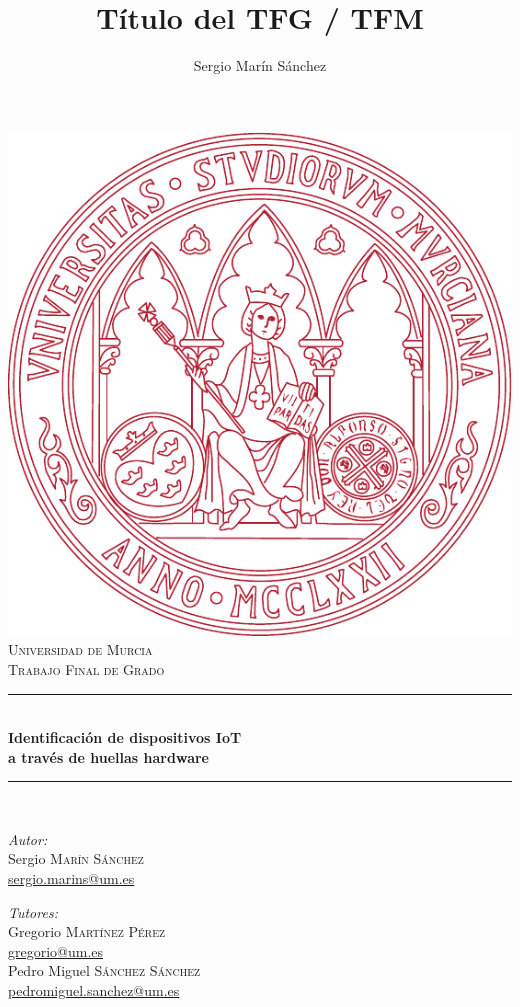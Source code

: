 \documentclass[a4paper,12pt]{book}
\newcommand{\HRule}{\rule{\linewidth}{0.5mm}}
\begin{document}
\title{Título del TFG / TFM}
\author{Sergio Marín Sánchez}

\begin{titlepage}
 
\begin{center}
 
\vfill

\includegraphics[height=0.5\textwidth]{escudo}\\[2.5cm]
 
\textsc{\LARGE Universidad de Murcia}\\[0.5cm]
 
\textsc{\Large Trabajo Final de Grado}\\[0.5cm]
 
\HRule \\[0.4cm]
{ \huge \bfseries Identificación de dispositivos IoT}\\[0.4cm]
{ \huge \bfseries  a través de huellas hardware}\\[0.4cm]
\HRule \\[1.5cm]
 
\begin{minipage}{0.4\textwidth}
\begin{flushleft} \large
\emph{Autor:}\\
Sergio \textsc{Marín Sánchez}\\
\href{mailto:sergio.marins@um.es}{sergio.marins@um.es}
\end{flushleft}
\end{minipage}
\begin{minipage}{0.4\textwidth}
\begin{flushright} \large
\emph{Tutores:} \\
Gregorio \textsc{Martínez Pérez}\\
\href{mailto:gregorio@um.es}{gregorio@um.es}\\
Pedro Miguel \textsc{Sánchez Sánchez}\\
\href{mailto:pedromiguel.sanchez@um.es}{pedromiguel.sanchez@um.es}
\end{flushright}
\end{minipage}
 
\vfill
 
{\large {}}
 
\end{center}
 
\end{titlepage}
\end{document}
